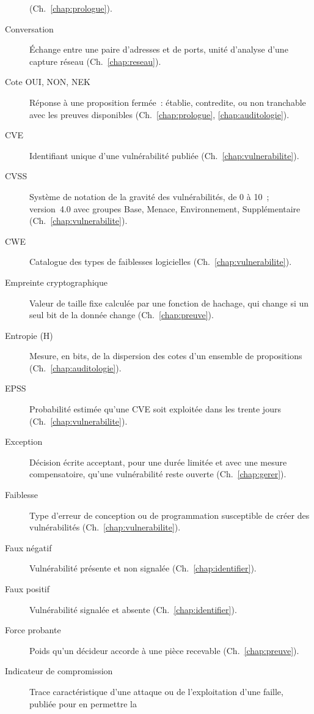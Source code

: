 \begin{description}
          (Ch.~\ref{chap:prologue}).
    \item[Conversation] Échange entre une paire d'adresses et de ports, unité
          d'analyse d'une capture réseau (Ch.~\ref{chap:reseau}).
    \item[Cote OUI, NON, NEK] Réponse à une proposition fermée~: établie,
          contredite, ou non tranchable avec les preuves disponibles
          (Ch.~\ref{chap:prologue}, \ref{chap:auditologie}).
    \item[CVE] Identifiant unique d'une vulnérabilité publiée
          (Ch.~\ref{chap:vulnerabilite}).
    \item[CVSS] Système de notation de la gravité des vulnérabilités, de 0 à
          10~; version~4.0 avec groupes Base, Menace, Environnement,
          Supplémentaire (Ch.~\ref{chap:vulnerabilite}).
    \item[CWE] Catalogue des types de faiblesses logicielles
          (Ch.~\ref{chap:vulnerabilite}).
    \item[Empreinte cryptographique] Valeur de taille fixe calculée par une
          fonction de hachage, qui change si un seul bit de la donnée change
          (Ch.~\ref{chap:preuve}).
    \item[Entropie (H)] Mesure, en bits, de la dispersion des cotes d'un
          ensemble de propositions (Ch.~\ref{chap:auditologie}).
    \item[EPSS] Probabilité estimée qu'une CVE soit exploitée dans les trente
          jours (Ch.~\ref{chap:vulnerabilite}).
    \item[Exception] Décision écrite acceptant, pour une durée limitée et avec
          une mesure compensatoire, qu'une vulnérabilité reste ouverte
          (Ch.~\ref{chap:gerer}).
    \item[Faiblesse] Type d'erreur de conception ou de programmation
          susceptible de créer des vulnérabilités (Ch.~\ref{chap:vulnerabilite}).
    \item[Faux négatif] Vulnérabilité présente et non signalée
          (Ch.~\ref{chap:identifier}).
    \item[Faux positif] Vulnérabilité signalée et absente
          (Ch.~\ref{chap:identifier}).
    \item[Force probante] Poids qu'un décideur accorde à une pièce recevable
          (Ch.~\ref{chap:preuve}).
    \item[Indicateur de compromission] Trace caractéristique d'une attaque
          ou de l'exploitation d'une faille, publiée pour en permettre la

\end{description}
